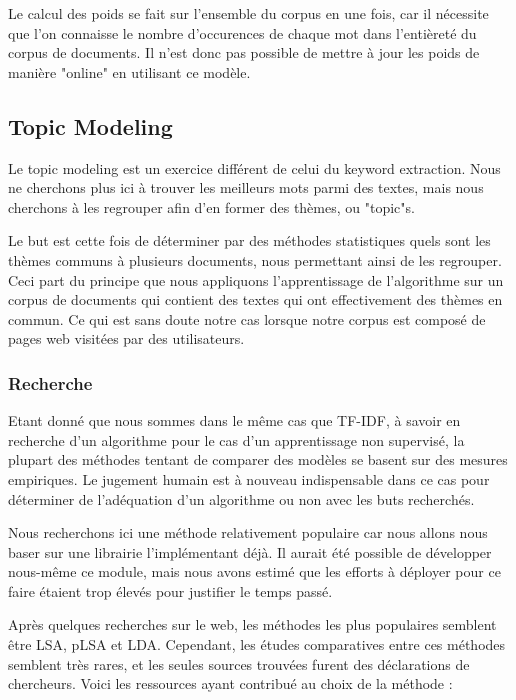 			Le calcul des poids se fait sur l'ensemble du corpus en une fois, car il nécessite que l'on connaisse le nombre d'occurences de chaque mot dans l'entièreté du corpus de documents. Il n'est donc pas possible de mettre à jour les poids de manière "online" en utilisant ce modèle.

	\subsection{Topic Modeling}

		Le topic modeling est un exercice différent de celui du keyword extraction. Nous ne cherchons plus ici à trouver les meilleurs mots parmi des textes, mais nous cherchons à les regrouper afin d'en former des thèmes, ou "topic"s.

		Le but est cette fois de déterminer par des méthodes statistiques quels sont les thèmes communs à plusieurs documents, nous permettant ainsi de les regrouper. Ceci part du principe que nous appliquons l'apprentissage de l'algorithme sur un corpus de documents qui contient des textes qui ont effectivement des thèmes en commun. Ce qui est sans doute notre cas lorsque notre corpus est composé de pages web visitées par des utilisateurs.

		\subsubsection{Recherche}

			Etant donné que nous sommes dans le même cas que TF-IDF, à savoir en recherche d'un algorithme pour le cas d'un apprentissage non supervisé, la plupart des méthodes tentant de comparer des modèles se basent sur des mesures empiriques. Le jugement humain est à nouveau indispensable dans ce cas pour déterminer de l'adéquation d'un algorithme ou non avec les buts recherchés.

			Nous recherchons ici une méthode relativement populaire car nous allons nous baser sur une librairie l'implémentant déjà. Il aurait été possible de développer nous-même ce module, mais nous avons estimé que les efforts à déployer pour ce faire étaient trop élevés pour justifier le temps passé.

			Après quelques recherches sur le web, les méthodes les plus populaires semblent être LSA, pLSA et LDA\cite{stanford-topicmodel}. Cependant, les études comparatives entre ces méthodes semblent très rares, et les seules sources trouvées furent des déclarations de chercheurs. Voici les ressources ayant contribué au choix de la méthode :

